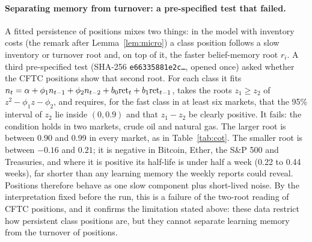 \paragraph{Separating memory from turnover: a pre-specified test that failed.} A fitted persistence of positions mixes two things: in the model with inventory costs (the remark after Lemma~\ref{lem:micro}) a class position follows a slow inventory or turnover root and, on top of it, the faster belief-memory root $r_i$. A third pre-specified test (SHA-256 \texttt{e66335881e2c\ldots}, opened once) asked whether the CFTC positions show that second root. For each class it fits $n_t=\alpha+\phi_1n_{t-1}+\phi_2n_{t-2}+b_0{\rm ret}_t+b_1{\rm ret}_{t-1}$, takes the roots $z_1\ge z_2$ of $z^2-\phi_1z-\phi_2$, and requires, for the fast class in at least six markets, that the 95\% interval of $z_2$ lie inside $(0,0.9)$ and that $z_1-z_2$ be clearly positive. It fails: the condition holds in two markets, crude oil and natural gas. The larger root is between 0.90 and 0.99 in every market, as in Table~\ref{tab:cot}. The smaller root is between $-0.16$ and $0.21$; it is negative in Bitcoin, Ether, the S\&P 500 and Treasuries, and where it is positive its half-life is under half a week (0.22 to 0.44 weeks), far shorter than any learning memory the weekly reports could reveal. Positions therefore behave as one slow component plus short-lived noise. By the interpretation fixed before the run, this is a failure of the two-root reading of CFTC positions, and it confirms the limitation stated above: these data restrict how persistent class positions are, but they cannot separate learning memory from the turnover of positions.

